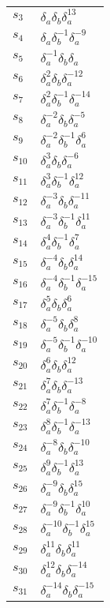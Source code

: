 \documentclass{article}
\begin{document}
\begin{center}
\begin{tabular}{ll}
$s_{3}$ & $\delta_a^{}\delta_b^{}\delta_a^{13}$ \\
$s_{4}$ & $\delta_a^{}\delta_b^{-1}\delta_a^{-9}$ \\
$s_{5}$ & $\delta_a^{-1}\delta_b^{}\delta_a^{}$ \\
$s_{6}$ & $\delta_a^{2}\delta_b^{}\delta_a^{-12}$ \\
$s_{7}$ & $\delta_a^{2}\delta_b^{-1}\delta_a^{-14}$ \\
$s_{8}$ & $\delta_a^{-2}\delta_b^{}\delta_a^{-5}$ \\
$s_{9}$ & $\delta_a^{-2}\delta_b^{-1}\delta_a^{6}$ \\
$s_{10}$ & $\delta_a^{3}\delta_b^{}\delta_a^{-6}$ \\
$s_{11}$ & $\delta_a^{3}\delta_b^{-1}\delta_a^{12}$ \\
$s_{12}$ & $\delta_a^{-3}\delta_b^{}\delta_a^{-11}$ \\
$s_{13}$ & $\delta_a^{-3}\delta_b^{-1}\delta_a^{11}$ \\
$s_{14}$ & $\delta_a^{4}\delta_b^{-1}\delta_a^{7}$ \\
$s_{15}$ & $\delta_a^{-4}\delta_b^{}\delta_a^{14}$ \\
$s_{16}$ & $\delta_a^{-4}\delta_b^{-1}\delta_a^{-15}$ \\
$s_{17}$ & $\delta_a^{5}\delta_b^{}\delta_a^{6}$ \\
$s_{18}$ & $\delta_a^{-5}\delta_b^{}\delta_a^{8}$ \\
$s_{19}$ & $\delta_a^{-5}\delta_b^{-1}\delta_a^{-10}$ \\
$s_{20}$ & $\delta_a^{6}\delta_b^{}\delta_a^{12}$ \\
$s_{21}$ & $\delta_a^{7}\delta_b^{}\delta_a^{-13}$ \\
$s_{22}$ & $\delta_a^{7}\delta_b^{-1}\delta_a^{-8}$ \\
$s_{23}$ & $\delta_a^{8}\delta_b^{-1}\delta_a^{-13}$ \\
$s_{24}$ & $\delta_a^{-8}\delta_b^{}\delta_a^{-10}$ \\
$s_{25}$ & $\delta_a^{9}\delta_b^{-1}\delta_a^{13}$ \\
$s_{26}$ & $\delta_a^{-9}\delta_b^{}\delta_a^{15}$ \\
$s_{27}$ & $\delta_a^{-9}\delta_b^{-1}\delta_a^{10}$ \\
$s_{28}$ & $\delta_a^{-10}\delta_b^{-1}\delta_a^{15}$ \\
$s_{29}$ & $\delta_a^{11}\delta_b^{}\delta_a^{11}$ \\
$s_{30}$ & $\delta_a^{12}\delta_b^{}\delta_a^{-14}$ \\
$s_{31}$ & $\delta_a^{-14}\delta_b^{}\delta_a^{-15}$ \\
\bottomrule
\end{tabular}
\end{center}

\thispagestyle{empty}
\end{document}
